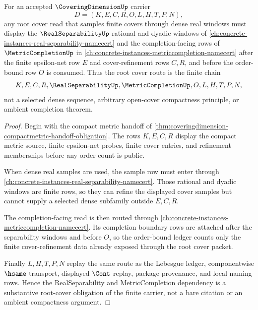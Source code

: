 \begin{theorem}
\label{thm:coveringdimension-real-separability-root-route}
For an accepted $\CoveringDimensionUp$ carrier
$$
D=(K,E,C,R,O,L,H,T,P,N),
$$
any root cover read that samples finite covers through dense real windows must display the $\RealSeparabilityUp$ rational and dyadic windows of \autoref{ch:concrete-instances-real-separability-namecert} and the completion-facing rows of $\MetricCompletionUp$ in \autoref{ch:concrete-instances-metriccompletion-namecert} after the finite epsilon-net row $E$ and cover-refinement rows $C,R$, and before the order-bound row $O$ is consumed. Thus the root cover route is the finite chain
$$
K,E,C,R,\RealSeparabilityUp,\MetricCompletionUp,O,L,H,T,P,N,
$$
not a selected dense sequence, arbitrary open-cover compactness principle, or ambient completion theorem.
\end{theorem}
\begin{proof}
Begin with the compact metric handoff of \autoref{thm:coveringdimension-compactmetric-handoff-obligation}. The rows $K,E,C,R$ display the compact metric source, finite epsilon-net probes, finite cover entries, and refinement memberships before any order count is public.

When dense real samples are used, the sample row must enter through \autoref{ch:concrete-instances-real-separability-namecert}. Those rational and dyadic windows are finite rows, so they can refine the displayed cover samples but cannot supply a selected dense subfamily outside $E,C,R$.

The completion-facing read is then routed through \autoref{ch:concrete-instances-metriccompletion-namecert}. Its completion boundary rows are attached after the separability windows and before $O$, so the order-bound ledger counts only the finite cover-refinement data already exposed through the root cover packet.

Finally $L,H,T,P,N$ replay the same route as the Lebesgue ledger, componentwise $\hsame$ transport, displayed $\Cont$ replay, package provenance, and local naming rows. Hence the RealSeparability and MetricCompletion dependency is a substantive root-cover obligation of the finite carrier, not a bare citation or an ambient compactness argument.
\end{proof}

